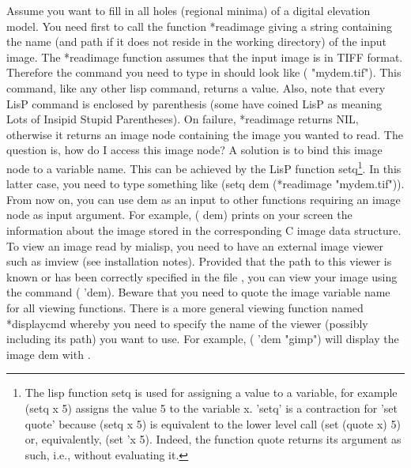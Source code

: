 \documentclass{book}
\begin{document}
Assume you want to fill in all holes (regional minima) of a digital elevation model.  You need first to call the function *readimage giving a string containing the name (and path if it does not reside in the working directory) of the input image.  The *readimage function assumes that the input image is in TIFF format.  Therefore the command you need to type in should look like ( "mydem.tif").  This command, like any other lisp command, returns a value.  Also, note that every LisP command is enclosed by parenthesis (some have coined LisP as meaning Lots of Insipid Stupid Parentheses).  On failure, *readimage returns NIL, otherwise it returns an image node containing the image you wanted to read.  The question is, how do I access this image node?  A solution is to bind this image node to a variable name.  This can be achieved by the LisP function setq\footnote{The lisp function setq is used for assigning a value to a variable, for example (setq x 5) assigns the value 5 to the variable x.  'setq' is a contraction for 'set quote' because (setq x 5) is equivalent to the lower level call (set (quote x) 5) or, equivalently, (set 'x 5).  Indeed, the function quote returns its argument as such, i.e., without evaluating it.}.  In this latter case, you need to type something like (setq dem (*readimage "mydem.tif")).  From now on, you can use dem as an input to other functions requiring an image node as input argument.  For example, ( dem) prints on your screen the information about the image stored in the corresponding C image data structure.  To view an image read by mialisp, you need to have an external image viewer such as imview (see installation notes).  Provided that the path to this viewer is known or has been correctly specified in the file  , you can view your image using the command ( 'dem).  Beware that you need to quote the image variable name for all viewing functions.  There is a more general viewing function named *displaycmd whereby you need to specify the name of the viewer (possibly including its path) you want to use.  For example, ( 'dem "gimp") will display the image dem with .
\end{document}
